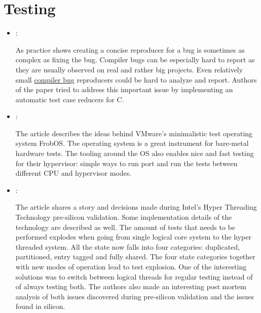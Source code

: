 \section*{Testing}
\begin{itemize}
    \item \cite{Regehr:C-Reduce:2012}:

    As practice shows creating a concise reproducer for a bug is sometimes as complex as fixing the bug. Compiler bugs can be especially hard to report as they are usually observed on real and rather big projects. Even relatively small \href{https://yulyugin.github.io/blog/2022/icc-bug}{compiler bug} reproducers could be hard to analyze and report. Authors of the paper tried to address this important issue by implementing an automatic test case reducers for C.

    \item \cite{Easson:FrobOS:2012}:

    The article describes the ideas behind VMware's minimalistic test operating system FrobOS. Tbe operating system is a great instrument for bare-metal hardware tests. The tooling around the OS also enables nice and fast testing for their hypervisor: simple ways to run port and run the tests between different CPU and hypervisor modes.

    \item \cite{Burns:IntelHTTValidation:2002}:

    The article shares a story and decisions made during Intel's Hyper Threading Technology pre-silicon validation. Some implementation details of the technology are described as well. The amount of tests that needs to be performed explodes when going from single logical core system to the hyper threaded system. All the state now falls into four categories: duplicated, partitioned, entry tagged and fully shared. The four state categories together with new modes of operation lead to test explosion. One of the interesting solutions was to switch between logical threads for regular testing instead of of always testing both. The authors also made an interesting post mortem analysis of both issues discovered during pre-silicon validation and the issues found in silicon.
\end{itemize}

